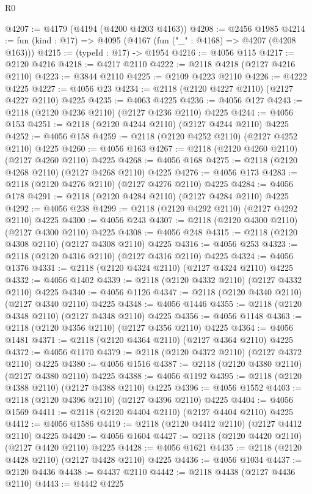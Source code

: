 \begin{lexlean}{R0}
\begin{coremodule}
@4207 := @4179 (@4194 (@4200 @4203 @4163))
@4208 := @2456 @1985
@4214 := fun (kind : @17) => @4095 (@4167 (fun ("_" : @4168) => @4207 (@4208 @163)))
@4215 := (typeId : @17) -> @1954
@4216 := @4056 @115
@4217 := @2120 @4216
@4218 := @4217 @2110
@4222 := @2118 @4218 (@2127 @4216 @2110)
@4223 := @3844 @2110
@4225 := @2109 @4223 @2110
@4226 := @4222 @4225
@4227 := @4056 @23
@4234 := @2118 (@2120 @4227 @2110) (@2127 @4227 @2110) @4225
@4235 := @4063 @4225
@4236 := @4056 @127
@4243 := @2118 (@2120 @4236 @2110) (@2127 @4236 @2110) @4225
@4244 := @4056 @153
@4251 := @2118 (@2120 @4244 @2110) (@2127 @4244 @2110) @4225
@4252 := @4056 @158
@4259 := @2118 (@2120 @4252 @2110) (@2127 @4252 @2110) @4225
@4260 := @4056 @163
@4267 := @2118 (@2120 @4260 @2110) (@2127 @4260 @2110) @4225
@4268 := @4056 @168
@4275 := @2118 (@2120 @4268 @2110) (@2127 @4268 @2110) @4225
@4276 := @4056 @173
@4283 := @2118 (@2120 @4276 @2110) (@2127 @4276 @2110) @4225
@4284 := @4056 @178
@4291 := @2118 (@2120 @4284 @2110) (@2127 @4284 @2110) @4225
@4292 := @4056 @238
@4299 := @2118 (@2120 @4292 @2110) (@2127 @4292 @2110) @4225
@4300 := @4056 @243
@4307 := @2118 (@2120 @4300 @2110) (@2127 @4300 @2110) @4225
@4308 := @4056 @248
@4315 := @2118 (@2120 @4308 @2110) (@2127 @4308 @2110) @4225
@4316 := @4056 @253
@4323 := @2118 (@2120 @4316 @2110) (@2127 @4316 @2110) @4225
@4324 := @4056 @1376
@4331 := @2118 (@2120 @4324 @2110) (@2127 @4324 @2110) @4225
@4332 := @4056 @1402
@4339 := @2118 (@2120 @4332 @2110) (@2127 @4332 @2110) @4225
@4340 := @4056 @1126
@4347 := @2118 (@2120 @4340 @2110) (@2127 @4340 @2110) @4225
@4348 := @4056 @1446
@4355 := @2118 (@2120 @4348 @2110) (@2127 @4348 @2110) @4225
@4356 := @4056 @1148
@4363 := @2118 (@2120 @4356 @2110) (@2127 @4356 @2110) @4225
@4364 := @4056 @1481
@4371 := @2118 (@2120 @4364 @2110) (@2127 @4364 @2110) @4225
@4372 := @4056 @1170
@4379 := @2118 (@2120 @4372 @2110) (@2127 @4372 @2110) @4225
@4380 := @4056 @1516
@4387 := @2118 (@2120 @4380 @2110) (@2127 @4380 @2110) @4225
@4388 := @4056 @1192
@4395 := @2118 (@2120 @4388 @2110) (@2127 @4388 @2110) @4225
@4396 := @4056 @1552
@4403 := @2118 (@2120 @4396 @2110) (@2127 @4396 @2110) @4225
@4404 := @4056 @1569
@4411 := @2118 (@2120 @4404 @2110) (@2127 @4404 @2110) @4225
@4412 := @4056 @1586
@4419 := @2118 (@2120 @4412 @2110) (@2127 @4412 @2110) @4225
@4420 := @4056 @1604
@4427 := @2118 (@2120 @4420 @2110) (@2127 @4420 @2110) @4225
@4428 := @4056 @1621
@4435 := @2118 (@2120 @4428 @2110) (@2127 @4428 @2110) @4225
@4436 := @4056 @1034
@4437 := @2120 @4436
@4438 := @4437 @2110
@4442 := @2118 @4438 (@2127 @4436 @2110)
@4443 := @4442 @4225

\end{coremodule}
\end{lexlean}
